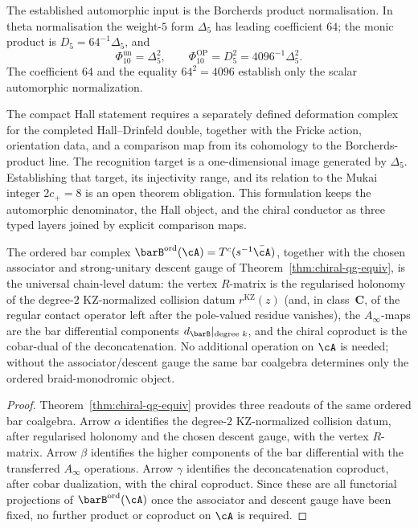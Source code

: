 \begin{remark}
\label{rem:oackd-4}
%
%
The established automorphic input is the Borcherds product
normalisation.  In theta normalisation the weight-$5$ form
$\Delta_5$ has leading coefficient $64$; the monic product is
$D_5=64^{-1}\Delta_5$, and
\[
  \Phi_{10}^{\mathrm{un}}=\Delta_5^2,
  \qquad
  \Phi_{10}^{\mathrm{OP}}=D_5^2=4096^{-1}\Delta_5^2.
\]
The coefficient $64$ and the equality $64^2=4096$ establish only the
scalar automorphic normalization.

The compact Hall statement requires a separately defined deformation
complex for the completed Hall--Drinfeld double, together with the
Fricke action, orientation data, and a comparison map from its
cohomology to the Borcherds-product line.  The recognition target is a
one-dimensional image generated by $\Delta_5$.  Establishing that
target, its injectivity range, and its relation to the Mukai integer
$2c_+=8$ is an open theorem obligation.  This formulation keeps the
automorphic denominator, the Hall object, and the chiral conductor as
three typed layers joined by explicit comparison maps.
\end{remark}

\begin{corollary}
\label{cor:bar-encodes-all}
\ClaimStatusConditional
{}
The ordered bar complex $\barB^{\mathrm{ord}}(\cA) =
T^c(s^{-1}\bar\cA)$, together with the chosen associator and
strong-unitary descent gauge of
Theorem~\textup{\ref{thm:chiral-qg-equiv}}, is the universal
chain-level datum: the vertex
$R$-matrix is the regularised holonomy of the degree-$2$
KZ-normalized collision datum
$r^{\mathrm{KZ}}(z)$ \textup{(}and, in class~$\mathbf{C}$, of the
regular contact operator left after the pole-valued residue
vanishes\textup{)},
the $A_\infty$-maps are the bar differential components
$d_{\barB}|_{\text{degree } k}$, and the chiral coproduct is
the cobar-dual of the deconcatenation. No additional operation on
$\cA$ is needed; without the associator/descent gauge the same bar
coalgebra determines only the ordered braid-monodromic object.
\end{corollary}

\begin{proof}
Theorem~\ref{thm:chiral-qg-equiv} provides three readouts of the same
ordered bar coalgebra.
Arrow $\alpha$ identifies the degree-$2$ KZ-normalized collision
datum, after regularised holonomy and the chosen descent gauge, with
the vertex $R$-matrix.
Arrow $\beta$ identifies the higher components of the bar differential
with the transferred $A_\infty$ operations.
Arrow $\gamma$ identifies the deconcatenation coproduct, after cobar
dualization, with the chiral coproduct.
Since these are all functorial projections of
$\barB^{\mathrm{ord}}(\cA)$ once the associator and descent gauge have
been fixed, no further product or coproduct on $\cA$ is required.
\end{proof}

